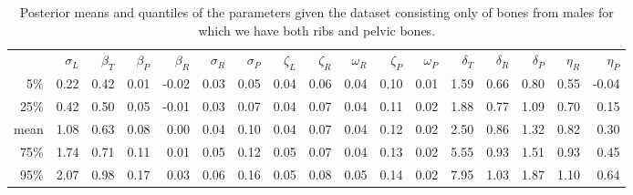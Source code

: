 \documentclass[12pt]{article}
\begin{document}
\begin{table}[ht]
    \footnotesize
\centering
\begin{tabular}{rrrrrrrrrrrrrrrrr}
  \hline
        &  $\sigma_L$  &  $\beta_T$  &  $\beta_P$  &  $\beta_R$  &  $\sigma_R$  &  $\sigma_P$  &  $\zeta_L$  &  $\zeta_R$  &  $\omega_R$  &  $\zeta_P$  &  $\omega_P$  &  $\delta_T$  &  $\delta_R$  &  $\delta_P$  &  $\eta_R$  &  $\eta_P$  \\
5\%     &  0.22    &  0.42   &  0.01   &  -0.02  &  0.03    &  0.05    &  0.04   &  0.06   &  0.04    &  0.10   &  0.01    &  1.59     &  0.66     &    0.80     & 0.55     & -0.04    \\
25\%    &  0.42    &  0.50   &  0.05   &  -0.01  &  0.03    &  0.07    &  0.04   &  0.07   &  0.04    &  0.11   &  0.02    &  1.88     &  0.77     &    1.09     & 0.70     & 0.15     \\
mean  &  1.08    &  0.63   &  0.08   &  0.00   &  0.04    &  0.10    &  0.04   &  0.07   &  0.04    &  0.12   &  0.02    &  2.50     &  0.86     &    1.32     & 0.82     & 0.30     \\
75\%    &  1.74    &  0.71   &  0.11   &  0.01   &  0.05    &  0.12    &  0.05   &  0.07   &  0.04    &  0.13   &  0.02    &  5.55     &  0.93     &    1.51     & 0.93     & 0.45     \\
95\%    &  2.07    &  0.98   &  0.17   &  0.03   &  0.06    &  0.16    &  0.05   &  0.08   &  0.05    &  0.14   &  0.02    &  7.95     &  1.03     &    1.87     & 1.10     & 0.64     \\
   \hline
\end{tabular}
\caption{ \label{tab:complete_males_posterior_distrns} Posterior means and quantiles of the parameters given the dataset consisting only of bones from males for which we have both ribs and pelvic bones.}
\end{table}
\end{document}
